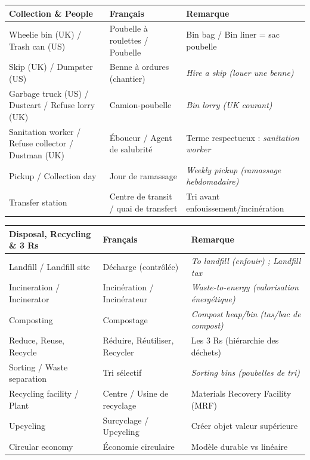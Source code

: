 \documentclass[11pt]{article}
\newcommand{\cle}[1]{{\popxbold\color{popdark}#1}}
\newcommand{\eng}[1]{\ifmmode\text{\textit{#1}}\else\begingroup\selectlanguage{english}\itshape #1\endgroup\fi}
\begin{document}
\vspace{0.3cm}
\begin{center}
\begin{tabularx}{\linewidth}{|X|X|X|}
\hline
\rowcolor{poporangeL} \textbf{Collection \& People} & \textbf{Français} & \textbf{Remarque} \\
\hline
\cle{Wheelie bin} (UK) / \cle{Trash can} (US) & Poubelle à roulettes / Poubelle & \cle{Bin bag} / \cle{Bin liner} = sac poubelle \\
\cle{Skip} (UK) / \cle{Dumpster} (US) & Benne à ordures (chantier) & \eng{Hire a skip} (louer une benne) \\
\cle{Garbage truck} (US) / \cle{Dustcart} / \cle{Refuse lorry} (UK) & Camion-poubelle & \eng{Bin lorry} (UK courant) \\
\cle{Sanitation worker} / \cle{Refuse collector} / \cle{Dustman} (UK) & Éboueur / Agent de salubrité & Terme respectueux : \eng{sanitation worker} \\
\cle{Pickup} / \cle{Collection day} & Jour de ramassage & \eng{Weekly pickup} (ramassage hebdomadaire) \\
\cle{Transfer station} & Centre de transit / quai de transfert & Tri avant enfouissement/incinération \\
\hline
\end{tabularx}
\end{center}

\vspace{0.3cm}
\begin{center}
\begin{tabularx}{\linewidth}{|X|X|X|}
\hline
\rowcolor{popgreenL} \textbf{Disposal, Recycling \& 3 Rs} & \textbf{Français} & \textbf{Remarque} \\
\hline
\cle{Landfill} / \cle{Landfill site} & Décharge (contrôlée) & \eng{To landfill} (enfouir) ; \eng{Landfill tax} \\
\cle{Incineration} / \cle{Incinerator} & Incinération / Incinérateur & \eng{Waste-to-energy} (valorisation énergétique) \\
\cle{Composting} & Compostage & \eng{Compost heap/bin} (tas/bac de compost) \\
\cle{Reduce, Reuse, Recycle} & Réduire, Réutiliser, Recycler & Les \cle{3 Rs} (hiérarchie des déchets) \\
\cle{Sorting} / \cle{Waste separation} & Tri sélectif & \eng{Sorting bins} (poubelles de tri) \\
\cle{Recycling facility} / \cle{Plant} & Centre / Usine de recyclage & \cle{Materials Recovery Facility} (MRF) \\
\cle{Upcycling} & Surcyclage / Upcycling & Créer objet valeur supérieure \\
\cle{Circular economy} & Économie circulaire & Modèle durable vs linéaire \\
\hline
\end{tabularx}
\end{center}
\end{document}
